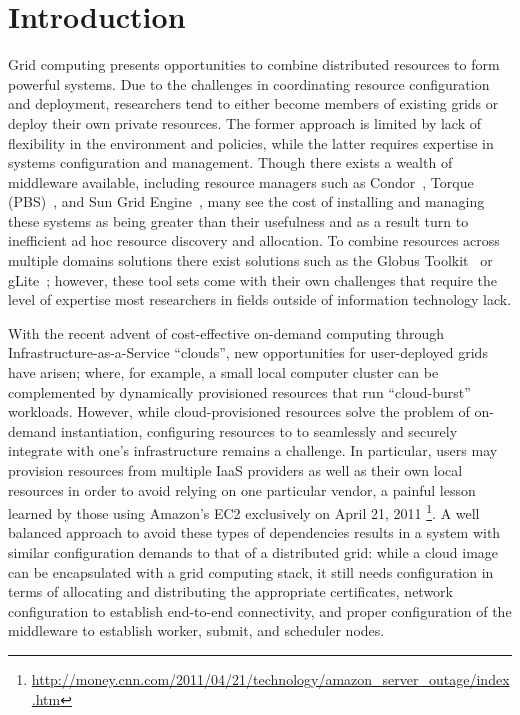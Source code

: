 \documentclass[twocolumn]{svjour3}
\begin{document}
\section{Introduction}

Grid computing presents opportunities to combine distributed resources to form
powerful systems.  Due to the challenges in coordinating resource configuration
and deployment, researchers tend to either become members of existing grids or
deploy their own private resources.  The former approach is limited by lack of
flexibility in the environment and policies, while the latter requires
expertise in systems configuration and management.  Though there exists a
wealth of middleware available, including resource managers such as
Condor~\cite{condor0}, Torque (PBS)~\cite{torque}, and Sun Grid
Engine~\cite{grid_engine}, many see the cost of installing and managing these
systems as being greater than their usefulness and as a result turn to
inefficient ad hoc resource discovery and allocation.  To combine resources
across multiple domains solutions there exist solutions such as the Globus
Toolkit~\cite{globus} or gLite~\cite{glite}; however, these tool sets come with
their own challenges that require the level of expertise most researchers in
fields outside of information technology lack.

With the recent advent of cost-effective on-demand computing through
Infrastructure-as-a-Service ``clouds'', new opportunities for user-deployed
grids have arisen; where, for example, a small local computer cluster can be
complemented by dynamically provisioned resources that run ``cloud-burst''
workloads.  However, while cloud-provisioned resources solve the problem of
on-demand instantiation, configuring resources to to seamlessly and securely
integrate with one's infrastructure remains a challenge.  In particular, users
may provision resources from multiple IaaS providers as well as their own local
resources in order to avoid relying on one particular vendor, a painful lesson
learned by those using Amazon's EC2 exclusively on April 21, 2011
\footnote{\url{http://money.cnn.com/2011/04/21/technology/amazon_server_outage/index.htm}}.
A well balanced approach to avoid these types of dependencies results in a
system with similar configuration demands to that of a distributed grid: while
a cloud image can be encapsulated with a grid computing stack, it still needs
configuration in terms of allocating and distributing the appropriate
certificates, network configuration to establish end-to-end connectivity, and
proper configuration of the middleware to establish worker, submit, and
scheduler nodes.  
\end{document}
